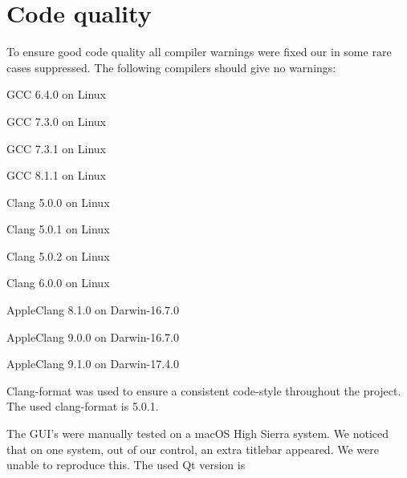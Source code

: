 \chapter{Code quality}
\label{chap:code-quality}

To ensure good code quality all compiler warnings were fixed our in some rare cases suppressed. The following compilers should give no warnings:
\begin{compactitem}
    \item GCC 6.4.0 on Linux
    \item GCC 7.3.0 on Linux
    \item GCC 7.3.1 on Linux
    \item GCC 8.1.1 on Linux
    \item Clang 5.0.0 on Linux
    \item Clang 5.0.1 on Linux
    \item Clang 5.0.2 on Linux
    \item Clang 6.0.0 on Linux
    \item AppleClang 8.1.0 on Darwin-16.7.0
    \item AppleClang 9.0.0 on Darwin-16.7.0
    \item AppleClang 9.1.0 on Darwin-17.4.0
\end{compactitem}

Clang-format was used to ensure a consistent code-style throughout the project. The used clang-format is 5.0.1.

The GUI's were manually tested on a macOS High Sierra system. We noticed that on one system, out of our control, an extra titlebar appeared. We were unable to reproduce this.
The used Qt version is 
